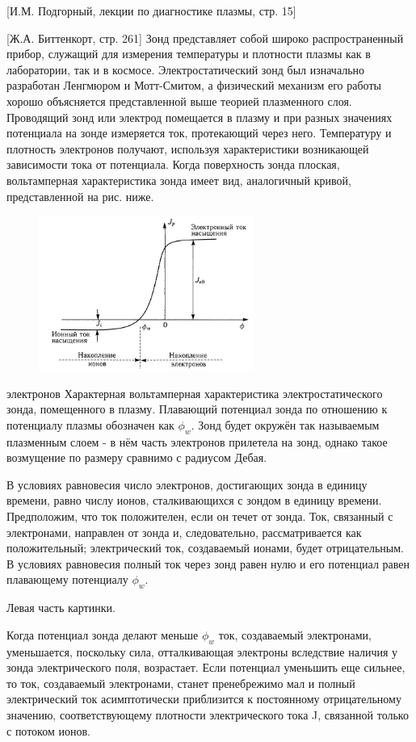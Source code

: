 \documentclass[10pt, a4paper]{article}
\begin{document}
[И.М. Подгорный, лекции по диагностике плазмы, стр. 15]

[Ж.А. Биттенкорт, стр. 261]
Зонд представляет собой широко распространенный прибор,  
служащий для измерения температуры и плотности плазмы как в  
лаборатории, так и в космосе. Электростатический зонд был изначально разработан Ленгмюром и Мотт-Смитом, а физический механизм его работы хорошо объясняется представленной выше теорией плазменного слоя. 
Проводящий зонд или электрод помещается в плазму и при разных 
значениях потенциала на зонде измеряется ток, протекающий через 
него. Температуру и плотность электронов получают, используя  
характеристики возникающей зависимости тока от потенциала. Когда поверхность зонда плоская, вольтамперная характеристика зонда имеет вид, аналогичный кривой, представленной на рис. ниже.
\begin{figure}[ht]
	\begin{center}
		\includegraphics[width=70mm]{VaH_zonda.JPG}
	\end{center}
\end{figure}
электронов 
Характерная вольтамперная характеристика электростатического зонда, помещенного в плазму. Плавающий потенциал зонда по отношению к потенциалу плазмы обозначен как $\phi_w$.
Зонд будет окружён так называемым плазменным слоем - в нём часть электронов прилетела на зонд, однако такое возмущение по размеру сравнимо с радиусом Дебая. 

В условиях равновесия число электронов, достигающих зонда в единицу времени, равно числу ионов, сталкивающихся с зондом в единицу времени. Предположим, что ток положителен, если 
он течет от зонда. Ток, связанный с электронами, направлен от зонда и, следовательно, рассматривается как положительный; электрический ток, создаваемый ионами, будет отрицательным. В условиях равновесия полный ток через зонд равен нулю и его потенциал равен плавающему потенциалу $\phi_w$.

Левая часть картинки.

Когда потенциал зонда делают меньше $\phi_w$ ток, 
создаваемый электронами, уменьшается, поскольку сила,  
отталкивающая электроны вследствие наличия у зонда электрического поля, возрастает. Если потенциал уменьшить еще сильнее, то ток, создаваемый электронами, станет пренебрежимо мал и полный электрический ток асимптотически приблизится к постоянному отрицательному значению, соответствующему плотности электрического тока J, связанной только с потоком ионов. 
\end{document}
